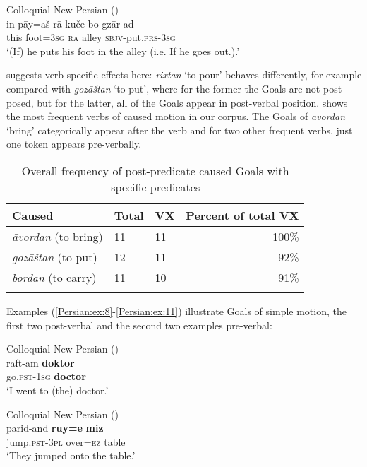 \documentclass[output=paper,colorlinks,citecolor=brown,draftmode]{langscibook}
\begin{document}
\ea\label{Persian:ex:7}
Colloquial New Persian (\citealt[F, 0836]{Izadi2022Persian}) \\
\gll in pāy=aš rā kuče bo-gzār-ad \\
this foot\textsc{=3sg} \textsc{ra} alley \textsc{sbjv-}put\textsc{.prs-3sg} \\
\glt `({I}f) he puts his foot in the alley (i.e. {I}f he goes out.).' 
\z

\citet[132]{frommer_post-verbal_1981} suggests verb-specific effects here: \textit{rixtan} `to pour' behaves differently, for example compared with \textit{gozāštan} `to put', where for the former the Goals are not post-posed, but for the latter, all of the Goals appear in post-verbal position.  shows the most frequent verbs of caused motion in our corpus. The Goals of \textit{āvordan} `bring' categorically appear after the verb and for two other frequent verbs, just one token appears pre-verbally.

\begin{table}
 \begin{tabularx}{\textwidth}{lYYr}
\lsptoprule
Caused  & Total & VX & Percent of total VX \\
\midrule
\textit{āvordan} (to bring) & 11 & 11 & 100\% \\
\textit{gozāštan} (to put) & 12 & 11 & 92\% \\
\textit{bordan} (to carry) & 11 & 10 & 91\% \\
\lspbottomrule
 \end{tabularx}
 \caption{Overall frequency of post-predicate caused Goals with specific predicates}
 \label{Persian:tab:8}
\end{table}

Examples (\ref{Persian:ex:8}-\ref{Persian:ex:11}) illustrate Goals of simple motion, the first two post-verbal and the second two examples pre-verbal: 

\ea\label{Persian:ex:8}
Colloquial New Persian (\citealt[C, 0256]{Izadi2022Persian}) \\
\gll raft-am \textbf{doktor} \\
go\textsc{.pst-1sg} \textbf{doctor} \\
\glt `I went to (the) doctor.' 
\z


\newpage
\ea\label{Persian:ex:9}
Colloquial New Persian (\citealt[P, 1849]{Izadi2022Persian}) \\
\gll parid-and \textbf{ruy=e} \textbf{miz} \\
jump\textsc{.pst-3pl} over\textsc{=ez} table \\
\glt `They jumped onto the table.'
\z
\end{document}
